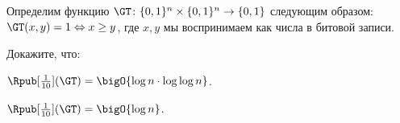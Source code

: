 Определим функцию $\GT\colon \{0, 1\}^n \times \{0, 1\}^n \to \{0, 1\}$ следующим образом:
$\GT(x, y) = 1 \Leftrightarrow x \ge y$, где $x, y$ мы воспринимаем как числа в битовой записи.

Докажите, что:
\begin{enumcyr}
    \item $\Rpub[\frac{1}{10}](\GT) = \bigO{\log n \cdot \log\log n}$.
    \item $\Rpub[\frac{1}{10}](\GT) = \bigO{\log n}$.
\end{enumcyr}

